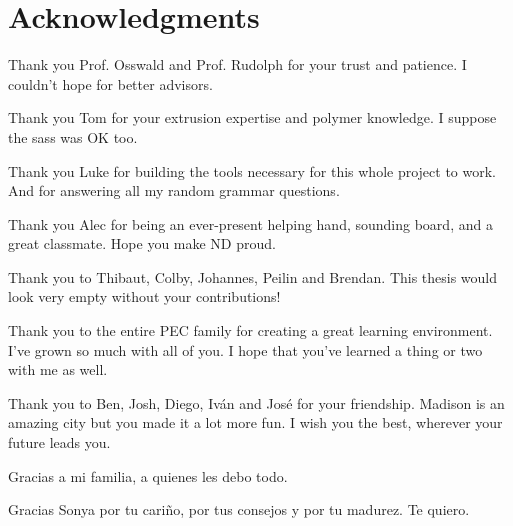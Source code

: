 \documentclass[main.tex]{subfiles}
\begin{document}
\chapter*{Acknowledgments}
{
\setlength{\parindent}{0cm}
\setlength{\parskip}{12pt}
Thank you Prof. Osswald and Prof. Rudolph for your trust and patience. I couldn't hope for better advisors.
     
Thank you Tom for your extrusion expertise and polymer knowledge. I suppose the sass was OK too.

Thank you Luke for building the tools necessary for this whole project to work. And for answering all my random grammar questions.

Thank you Alec for being an ever-present helping hand, sounding board, and a great classmate. Hope you make ND proud.

Thank you to Thibaut, Colby, Johannes, Peilin and Brendan. This thesis would look very empty without your contributions!
    
Thank you to the entire PEC family for creating a great learning environment. I've grown so much with all of you. I hope that you've learned a thing or two with me as well.

Thank you to Ben, Josh, Diego, Iv\'an and Jos\'e for your friendship. Madison is an amazing city but you made it a lot more fun. I wish you the best, wherever your future leads you.

Gracias a mi familia, a quienes les debo todo.

Gracias Sonya por tu cari\~no, por tus consejos y por tu madurez. Te quiero.  
}
\end{document}
